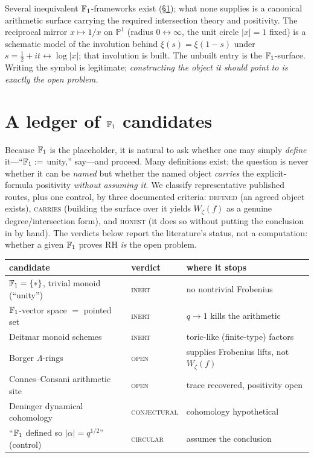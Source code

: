 \documentclass[11pt]{article}
\begin{document}
\noindent Several inequivalent $\mathbb{F}_1$-frameworks exist (\S\ref{sec:ledger}); what none
supplies is a canonical arithmetic surface carrying the required intersection theory
and positivity. The reciprocal mirror $x\mapsto 1/x$ on $\mathbb{P}^1$ (radius $0
\leftrightarrow \infty$, the unit circle $|x|=1$ fixed) is a schematic model of the
involution behind $\xi(s)=\xi(1-s)$ under $s=\tfrac12+it \leftrightarrow \log|x|$; that
involution is built. The unbuilt entry is the $\mathbb{F}_1$-surface. Writing the symbol is
legitimate; \emph{constructing the object it should point to is exactly the open
problem.}

\section{A ledger of \texorpdfstring{$\mathbb{F}_1$}{F1} candidates}\label{sec:ledger}
Because $\mathbb{F}_1$ is the placeholder, it is natural to ask whether one may simply
\emph{define} it---``$\mathbb{F}_1 :=$ unity,'' say---and proceed. Many definitions exist; the
question is never whether it can be \emph{named} but whether the named object
\emph{carries} the explicit-formula positivity \emph{without assuming it}. We classify
representative published routes, plus one control, by three documented criteria: \textsc{defined} (an
agreed object exists), \textsc{carries} (building the surface over it yields $W_\zeta(f)$ as a
genuine degree/intersection form), and \textsc{honest} (it does so without putting the
conclusion in by hand). The verdicts below report the literature's status, not a
computation: whether a given $\mathbb{F}_1$ proves RH \emph{is} the open problem.

\begin{center}\small
\begin{tabular}{lll}
\hline
candidate & verdict & where it stops \\
\hline
$\mathbb{F}_1=\{*\}$, trivial monoid (``unity'') & \textsc{inert} & no nontrivial Frobenius \\
$\mathbb{F}_1$-vector space $=$ pointed set \cite{Cohn} & \textsc{inert} & $q\to1$ kills the arithmetic \\
Deitmar monoid schemes \cite{Deitmar} & \textsc{inert} & toric-like (finite-type) factors \\
Borger $\Lambda$-rings \cite{Borger} & \textsc{open} & supplies Frobenius lifts, not $W_\zeta(f)$ \\
Connes--Consani arithmetic site \cite{ConnesConsani} & \textsc{open} & trace recovered, positivity open \\
Deninger dynamical cohomology \cite{Deninger} & \textsc{conjectural} & cohomology hypothetical \\
``$\mathbb{F}_1$ defined so $|\alpha|=q^{1/2}$'' (control) & \textsc{circular} & assumes the conclusion \\
\hline
\end{tabular}
\end{center}
\end{document}
